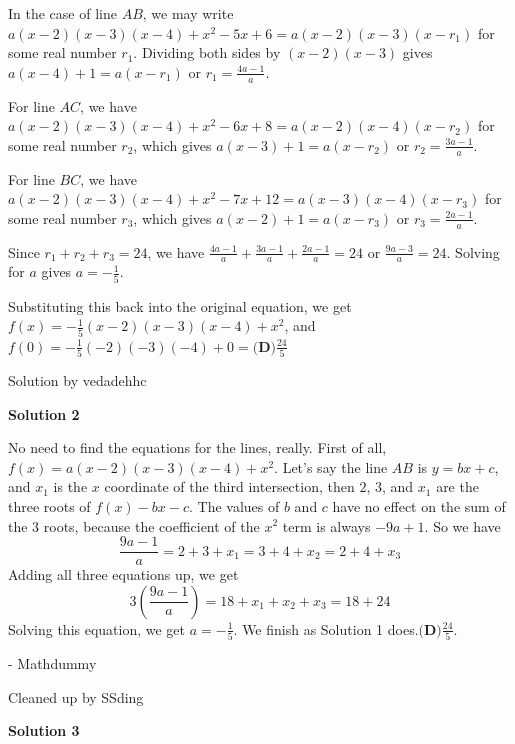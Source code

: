 \begin{enumerate}
 In the case of line $AB$, we may write $a(x-2)(x-3)(x-4)+x^2-5x+6 = a(x-2)(x-3)(x-r_1)$ for some real number $r_1$. Dividing both sides by $(x-2)(x-3)$ gives $a(x-4)+1 = a(x-r_1)$ or $r_1 = \frac {4a-1}{a}$.

 For line $AC$, we have $a(x-2)(x-3)(x-4)+x^2-6x+8 = a(x-2)(x-4)(x-r_2)$ for some real number $r_2$, which gives $a(x-3)+1 = a(x-r_2)$ or $r_2 = \frac {3a-1}{a}$.

 For line $BC$, we have $a(x-2)(x-3)(x-4)+x^2-7x+12 = a(x-3)(x-4)(x-r_3)$ for some real number $r_3$, which gives $a(x-2)+1 = a(x-r_3)$ or $r_3 = \frac {2a-1}{a}$.

 Since $r_1 + r_2 + r_3 = 24$, we have $\frac {4a-1}{a} + \frac {3a-1}{a} + \frac {2a-1}{a} = 24$ or $\frac {9a-3}{a} = 24$. Solving for $a$ gives $a = - \frac{1}{5}$.

 Substituting this back into the original equation, we get $f(x) = -\frac{1}{5}(x-2)(x-3)(x-4) + x^2$, and $f(0) = -\frac{1}{5}(-2)(-3)(-4) + 0 = \boxed{\textbf{(D)}\frac{24}{5}}$

 Solution by vedadehhc

 



\textbf{Solution 2}

No need to find the equations for the lines, really. First of all, $f(x) = a(x-2)(x-3)(x-4) +x^2$. Let's say the line $AB$ is $y=bx+c$, and $x_1$ is the $x$ coordinate of the third intersection, then $2$, $3$, and $x_1$ are the three roots of $f(x) - bx-c$. The values of $b$ and $c$ have no effect on the sum of the 3 roots, because the coefficient of the $x^2$ term is always $-9a+1$. So we have 
 \[\frac{9a-1}{a} = 2 + 3 + x_1= 3 + 4 + x_2 = 2 + 4 + x_3\]Adding all three equations up, we get 
 \[3\left(\frac{9a-1}{a}\right) = 18 + x_1 + x_2 + x_3 = 18 + 24\]Solving this equation, we get $a = -\frac{1}{5}$. We finish as Solution 1 does.$\boxed{\textbf{(D)}\frac{24}{5}}$.

 - Mathdummy

 Cleaned up by SSding

 



\textbf{Solution 3}


\end{enumerate}
